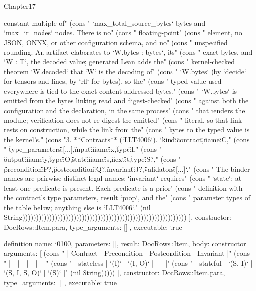 \begin{lexlean}{Chapter17}
\begin{semanticmodule}
{{constant multiple of" (cons "   `max_total_source_bytes` bytes and `max_ir_nodes` nodes. There is no" (cons "   floating-point" (cons "   element, no JSON, ONNX, or other configuration schema, and no" (cons "   unspecified rounding. An artifact elaborates to `W.bytes : bytes`, its" (cons "   exact bytes, and `W : T`, the decoded value; generated Lean adds the" (cons "   kernel-checked theorem `W.decoded` that `W` is the decoding of" (cons "   `W.bytes` (by `decide` for tensors and lines, by `rfl` for bytes), so the" (cons "   typed value used everywhere is tied to the exact content-addressed bytes." (cons "   `W.bytes` is emitted from the bytes linking read and digest-checked" (cons "   against both the configuration and the declaration, in the same process" (cons "   that renders the module; verification does not re-digest the emitted" (cons "   literal, so that link rests on construction, while the link from the" (cons "   bytes to the typed value is the kernel's." (cons "3. **Contracts** (`LLT4006`). `{\"kind\":\"contract\",\"name\":C," (cons "   \"type_parameters\":[...],\"input\":{\"name\":x,\"type\":I}," (cons "   \"output\":{\"name\":y,\"type\":O},\"state\":{\"name\":s,\"next\":t,\"type\":S}?," (cons "   \"precondition\":P?,\"postcondition\":Q?,\"invariant\":J?,\"validators\":[...]}`." (cons "   The binder names are pairwise distinct legal names; `invariant` requires" (cons "   `state`; at least one predicate is present. Each predicate is a prior" (cons "   definition with the contract's type parameters, result `prop`, and the" (cons "   parameter types of the table below; anything else is `LLT4006`." (nil String)))))))))))))))))))))))))))))))))))))))))))))))))))))))))))))
    ],
    constructor: DocRows::Item.para,
    type_arguments: []
  },
  executable: true
}

definition{
  name: i0100,
  parameters: [],
  result: DocRows::Item,
  body: constructor{
    arguments: [
      (cons "   | Contract | Precondition | Postcondition | Invariant |" (cons "   |---|---|---|---|" (cons "   | stateless | `(I)` | `(I, O)` | — |" (cons "   | stateful | `(S, I)` | `(S, I, S, O)` | `(S)` |" (nil String)))))
    ],
    constructor: DocRows::Item.para,
    type_arguments: []
  },
  executable: true
}


\end{semanticmodule}
\end{lexlean}
